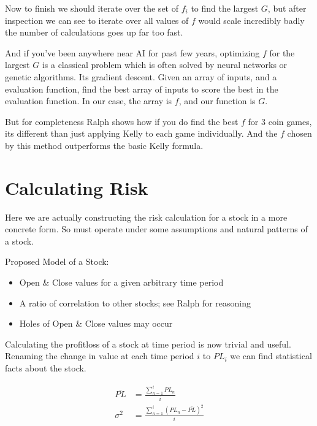 \documentclass[12pt]{article}
\begin{document}
    Now to finish we should iterate over the set of \(f_i\) to find the largest \(G\), but after
    inspection we can see to iterate over all values of \(f\) would scale incredibly badly
    the number of calculations goes up far too fast.

    And if you've been anywhere near AI for past few years, optimizing \(f\) for the largest 
    \(G\) is a classical problem which is often solved by neural networks or genetic
    algorithms. Its gradient descent. Given an array of inputs, and a evaluation function,
    find the best array of inputs to score the best in the evaluation function. In our case,
    the array is \(f\), and our function is \(G\).

    But for completeness Ralph\cite{Ralph} shows how if you do find the best \(f\) for 3 coin
    games, its different than just applying Kelly to each game individually. And the \(f\)
    chosen by this method outperforms the basic Kelly formula.

\section{Calculating Risk}

    Here we are actually constructing the risk calculation for a stock in a more concrete form.
    So must operate under some assumptions and natural patterns of a stock. 

    Proposed Model of a Stock: 
    \begin{itemize}
        \item{Open {\&} Close values for a given arbitrary time period}
        \item{A ratio of correlation to other stocks; see Ralph \cite{Ralph} for reasoning}
        \item{Holes of Open {\&} Close values may occur}
    \end{itemize}

    Calculating the profit{\/}loss of a stock at time period is now trivial and useful.
    Renaming the change in value at each time period \(i\) to \(PL_i\) we can find
    statistical facts about the stock.

    \begin{align}
        \bar{PL} &= \frac{\sum^{i}_{n=1} PL_n}{i} \label{eq:StockMean} \\
        \sigma^2 &= \frac{\sum^{i}_{n=1} (PL_n - \bar{PL})^2}{i} \label{eq:StockVar}
    \end{align}
\end{document}
